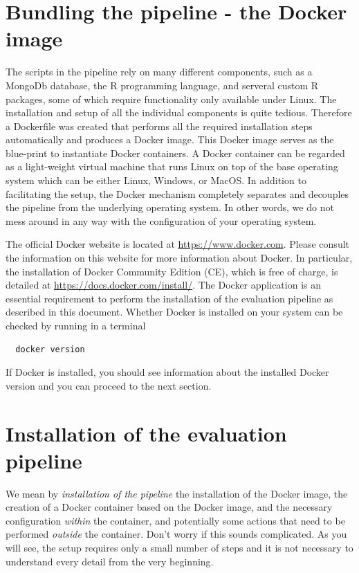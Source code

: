 \documentclass[12pt,a4paper]{scrartcl}
\begin{document}
\section{Bundling the pipeline - the Docker image} 
The scripts in the pipeline rely on many different components, such as a MongoDb database, the R programming language, and serveral custom R packages, some of which require functionality only available under Linux.
The installation and setup of all the individual components is quite tedious.
Therefore a Dockerfile was created that performs all the required installation steps automatically and produces a Docker image. This Docker image serves as the blue-print to instantiate Docker containers. A Docker container can be regarded as a light-weight virtual machine that runs Linux on top of the base operating system which can be either Linux, Windows, or MacOS.
In addition to facilitating the setup, the Docker mechanism completely separates and decouples the pipeline from the underlying operating  system.
In other words, we do not mess around in any way with the configuration of your operating system.

The official Docker website is located at \url{https://www.docker.com}.
Please consult the information on this website for more information about Docker.
In particular, the installation of Docker Community Edition (CE), which is free of charge, is detailed at \url{https://docs.docker.com/install/}.
The Docker application is an essential requirement to perform the installation of the evaluation pipeline as described in this document.
Whether Docker is installed on your system can be checked by running in a terminal
\begin{verbatim}
  docker version
\end{verbatim}
If Docker is installed, you should see information about the installed Docker version and you can proceed to the next section.

 \section{Installation of the evaluation pipeline}
We mean by \textit{installation of the pipeline} the installation of the Docker image, the creation of a Docker container based on the Docker image, and the necessary configuration \textit{within} the container, and potentially some actions that need to be performed \textit{outside} the container.
Don't worry if this sounds complicated.
As you will see, the setup requires only a small number of steps and it is not necessary to understand every detail from the very beginning.
\end{document}
